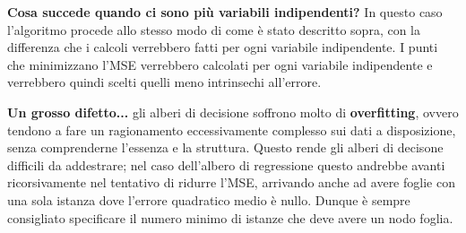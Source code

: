 \documentclass[a4paper, 11pt, oneside]{report}
\begin{document}
                \bigskip
                \par \noindent \textbf{Cosa succede quando ci sono più variabili indipendenti?} In questo caso l'algoritmo
                procede allo stesso modo di come è stato descritto sopra, con la differenza che i calcoli verrebbero fatti
                per ogni variabile indipendente. I punti che minimizzano l'MSE verrebbero calcolati per ogni variabile
                indipendente e verrebbero quindi scelti quelli meno intrinsechi all'errore.
                \\
                \par \noindent \textbf{Un grosso difetto...} gli alberi di decisione soffrono molto di \textbf{overfitting},
                ovvero tendono a fare un ragionamento eccessivamente complesso sui dati a disposizione, senza comprenderne
                l'essenza e la struttura. Questo rende gli alberi di decisone difficili da addestrare; nel caso dell'albero
                di regressione questo andrebbe avanti ricorsivamente nel tentativo di ridurre l'MSE, arrivando anche ad
                avere foglie con una sola istanza dove l'errore quadratico medio è nullo. Dunque è sempre consigliato
                specificare il numero minimo di istanze che deve avere un nodo foglia.
                \\
                \newpage
\end{document}
